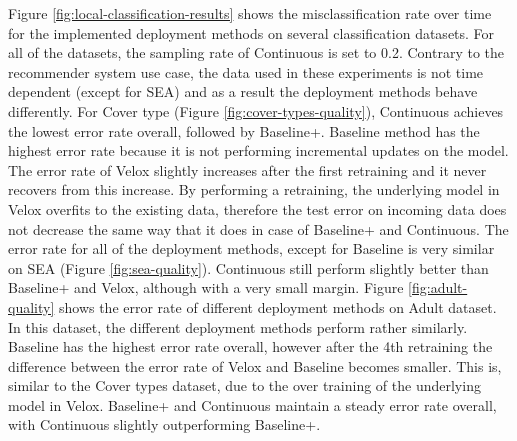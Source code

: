 \documentclass{vldb}
\begin{document}
Figure \ref{fig:local-classification-results} shows the misclassification rate over time for the implemented deployment methods on several classification datasets.
For all of the datasets, the sampling rate of Continuous is set to 0.2.
Contrary to the recommender system use case, the data used in these experiments is not time dependent (except for SEA) and as a result the deployment methods behave differently.
For Cover type (Figure \ref{fig:cover-types-quality}), Continuous achieves the lowest error rate overall, followed by Baseline+.
Baseline method has the highest error rate because it is not performing incremental updates on the model.
The error rate of Velox slightly increases after the first retraining and it never recovers from this increase.
By performing a retraining, the underlying model in Velox overfits to the existing data, therefore the test error on incoming data does not decrease the same way that it does in case of Baseline+ and Continuous.
The error rate for all of the deployment methods, except for Baseline is very similar on SEA (Figure \ref{fig:sea-quality}).
Continuous still perform slightly better than Baseline+ and Velox, although with a very small margin.
Figure \ref{fig:adult-quality} shows the error rate of different deployment methods on Adult dataset.
In this dataset, the different deployment methods perform rather similarly.
Baseline has the highest error rate overall, however after the 4th retraining the difference between the error rate of Velox and Baseline becomes smaller.
This is, similar to the Cover types dataset, due to the over training of the underlying model in Velox.
Baseline+ and Continuous maintain a steady error rate overall, with Continuous slightly outperforming Baseline+.
\end{document}
